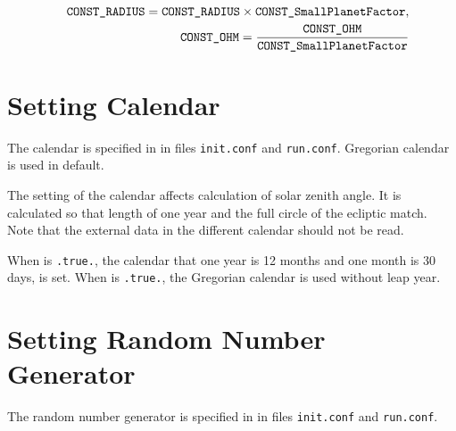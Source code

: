 \begin{eqnarray}
   && \nmitemeq{CONST_RADIUS} = \nmitemeq{CONST_RADIUS} \times \nmitemeq{CONST_SmallPlanetFactor}, \\
   && \nmitemeq{CONST_OHM}    = \frac{\nmitemeq{CONST_OHM}}{\nmitemeq{CONST_SmallPlanetFactor}}
\end{eqnarray}



\section{Setting Calendar} \label{subsec:calendar}

The calendar is specified in  in files \verb|init.conf| and \verb|run.conf|.
Gregorian calendar is used in default.


\noindent
The setting of the calendar affects calculation of solar zenith angle.
It is calculated so that length of one year and the full circle of the ecliptic match.
Note that the external data in the different calendar should not be read.

When  is \verb|.true.|,
the calendar that one year is 12 months and one month is 30 days, is set.
%
When  is \verb|.true.|,
the Gregorian calendar is used without leap year.



\section{Setting Random Number Generator} \label{subsec:random}

The random number generator is specified in  in files \verb|init.conf| and \verb|run.conf|.

